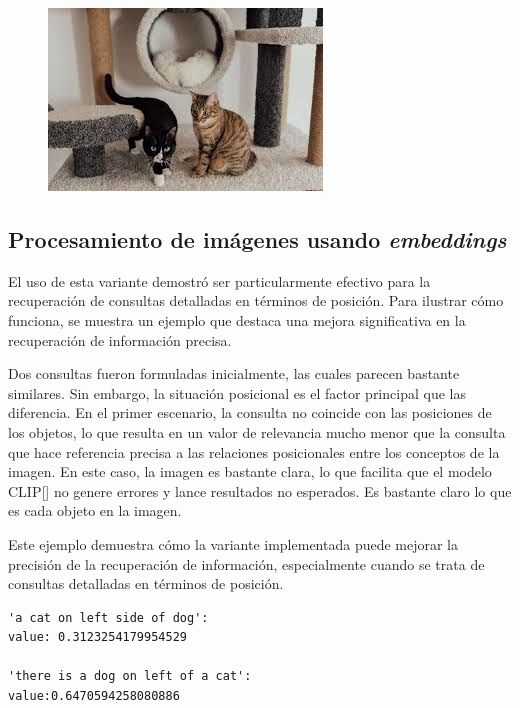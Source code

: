 \begin{figure}[H]
\begin{minipage}{0.3\textwidth}
 \includegraphics[width=\textwidth]{Graphics/Images/image_15.jpg}
 \caption{ }
 \label{fig:15}
\end{minipage}
\end{figure}

\subsection{Procesamiento de im\'agenes usando \textit{embeddings}}
El uso de esta variante demostró ser particularmente efectivo para la recuperación de consultas detalladas en términos de posición. Para ilustrar cómo funciona, se muestra un ejemplo que destaca una mejora significativa en la recuperación de información precisa.

Dos consultas fueron formuladas inicialmente, las cuales parecen bastante similares. Sin embargo, la situación posicional es el factor principal que las diferencia. En el primer escenario, la consulta no coincide con las posiciones de los objetos, lo que resulta en un valor de relevancia mucho menor que la consulta que hace referencia precisa a las relaciones posicionales entre los conceptos de la imagen. En este caso, la imagen es bastante clara, lo que facilita que el modelo CLIP[\cite{clip}] no genere errores y lance resultados no esperados. Es bastante claro lo que es cada objeto en la imagen.

Este ejemplo demuestra cómo la variante implementada puede mejorar la precisión de la recuperación de información, especialmente cuando se trata de consultas detalladas en términos de posición.

\begin{verbatim}
'a cat on left side of dog':
value: 0.3123254179954529

'there is a dog on left of a cat':
value:0.6470594258080886
\end{verbatim}

